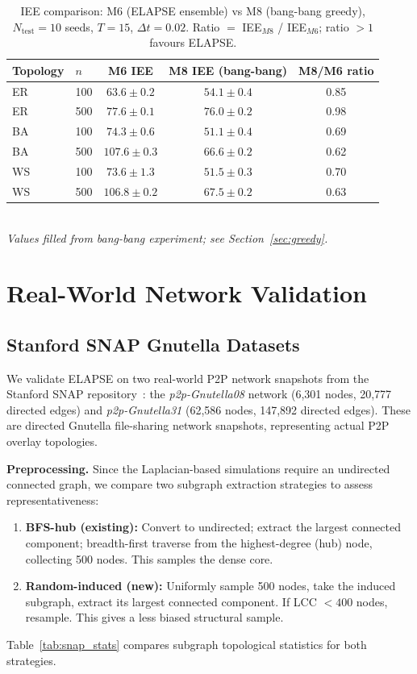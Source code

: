 \documentclass[review,12pt]{elsarticle}
\begin{document}
\begin{table}[htbp]
  \caption{IEE comparison: M6 (ELAPSE ensemble) vs M8 (bang-bang greedy),
           $N_{\mathrm{test}}=10$ seeds, $T=15$, $\Delta t=0.02$.
           Ratio $=$ IEE$_{M8}$ / IEE$_{M6}$; ratio $>1$ favours ELAPSE.}
  \label{tab:greedy}
  \centering
  \small
  \renewcommand{\arraystretch}{1.2}
  \begin{tabular}{llccc}
    \toprule
    Topology & $n$ & M6 IEE & M8 IEE (bang-bang) & M8/M6 ratio \\
    \midrule
    ER & 100 & $63.6\pm 0.2$ & $54.1\pm 0.4$ & 0.85 \\
    ER & 500 & $77.6\pm 0.1$ & $76.0\pm 0.2$ & 0.98 \\
    BA & 100 & $74.3\pm 0.6$ & $51.1\pm 0.4$ & 0.69 \\
    BA & 500 & $107.6\pm 0.3$ & $66.6\pm 0.2$ & 0.62 \\
    WS & 100 & $73.6\pm 1.3$ & $51.5\pm 0.3$ & 0.70 \\
    WS & 500 & $106.8\pm 0.2$ & $67.5\pm 0.2$ & 0.63 \\
    \bottomrule
  \end{tabular}
  \smallskip\\
  \small\textit{Values filled from bang-bang experiment; see Section~\ref{sec:greedy}.}
\end{table}

\section{Real-World Network Validation}
\label{sec:snap}

\subsection{Stanford SNAP Gnutella Datasets}

We validate ELAPSE on two real-world P2P network snapshots from the
Stanford SNAP repository~\cite{snapnets,leskovec2007graph}: the
\emph{p2p-Gnutella08} network (6,301 nodes, 20,777 directed edges) and
\emph{p2p-Gnutella31} (62,586 nodes, 147,892 directed edges). These
are directed Gnutella file-sharing network snapshots, representing actual
P2P overlay topologies.

\textbf{Preprocessing.} Since the Laplacian-based simulations require an
undirected connected graph, we compare two subgraph extraction strategies
to assess representativeness:
\begin{enumerate}
  \item \textbf{BFS-hub (existing):} Convert to undirected; extract the largest
        connected component; breadth-first traverse from the highest-degree
        (hub) node, collecting 500 nodes. This samples the dense core.
  \item \textbf{Random-induced (new):} Uniformly sample 500 nodes, take the
        induced subgraph, extract its largest connected component. If LCC
        $< 400$ nodes, resample. This gives a less biased structural sample.
\end{enumerate}
Table~\ref{tab:snap_stats} compares subgraph topological statistics for
both strategies.
\end{document}

